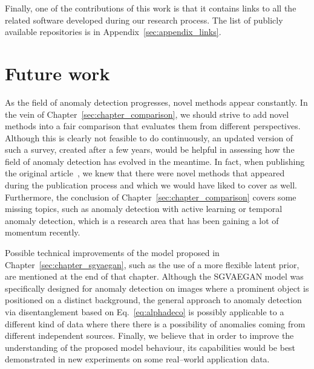 Finally, one of the contributions of this work is that it contains links to all the related software developed during our research process. The list of publicly available repositories is in Appendix~\ref{sec:appendix_links}.

\section{Future work}
As the field of anomaly detection progresses, novel methods appear constantly. In the vein of Chapter~\ref{sec:chapter_comparison}, we should strive to add novel methods into a fair comparison that evaluates them from different perspectives. Although this is clearly not feasible to do continuously, an updated version of such a survey, created after a few years, would be helpful in assessing how the field of anomaly detection has evolved in the meantime. In fact, when publishing the original article~\cite{vskvara2021comparison}, we knew that there were novel methods that appeared during the publication process and which we would have liked to cover as well. Furthermore, the conclusion of Chapter~\ref{sec:chapter_comparison} covers some missing topics, such as anomaly detection with active learning or temporal anomaly detection, which is a research area that has been gaining a lot of momentum recently.

Possible technical improvements of the model proposed in Chapter~\ref{sec:chapter_sgvaegan}, such as the use of a more flexible latent prior, are mentioned at the end of that chapter. Although the SGVAEGAN model was specifically designed for anomaly detection on images where a prominent object is positioned on a distinct background, the general approach to anomaly detection via disentanglement based on Eq.~\eqref{eq:alphadeco} is possibly applicable to a different kind of data where there there is a possibility of anomalies coming from different independent sources. Finally, we believe that in order to improve the understanding of the proposed model behaviour, its capabilities would be best demonstrated in new experiments on some real--world application data.